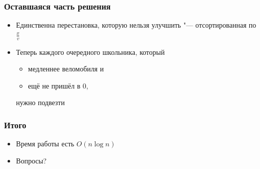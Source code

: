 \begin{frame}
  \frametitle{Оставшаяся часть решения}
  \begin{itemize}
    \item Единственна перестановка, которую нельзя улучшить "--- отсортированная по $\frac{x}{v}$
    \item Теперь каждого очередного школьника, который
      \begin{itemize}
        \item медленнее веломобиля и
        \item ещё не пришёл в $0$,
      \end{itemize}
      нужно подвезти
  \end{itemize}
\end{frame}

\begin{frame}
  \frametitle{Итого}
  \begin{itemize}
    \item Время работы есть $O(n \log n)$
    \item Вопросы?
  \end{itemize}
\end{frame}
